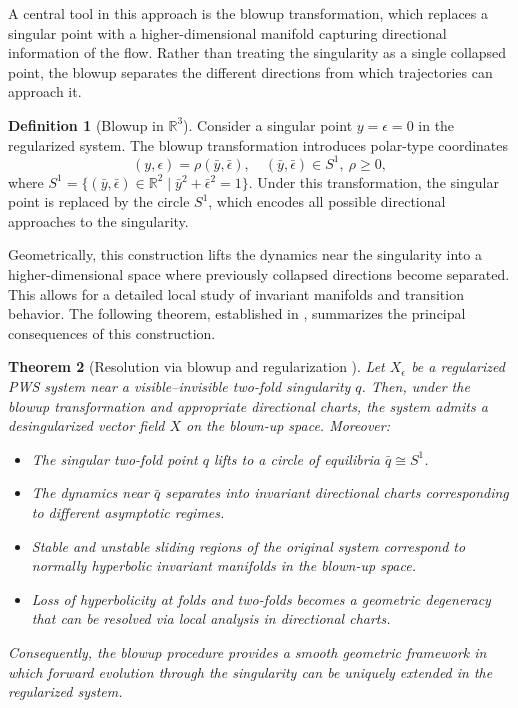 \documentclass[12pt, a4paper, oneside]{book}
\theoremstyle{plain}
\newtheorem{theorem}{Theorem}[chapter]
\theoremstyle{definition}
\newtheorem{definition}[theorem]{Definition}
\theoremstyle{remark}
\theoremstyle{definition}
\begin{document}
A central tool in this approach is the blowup transformation, which replaces a singular
point with a higher-dimensional manifold capturing directional information of the flow.
Rather than treating the singularity as a single collapsed point, the blowup separates
the different directions from which trajectories can approach it.

\begin{definition}[Blowup in $\mathbb{R}^3$]
Consider a singular point $y=\epsilon=0$ in the regularized system. The blowup
transformation introduces polar-type coordinates
\[
(y,\epsilon) = \rho(\bar{y}, \bar{\epsilon}), \quad (\bar{y},\bar{\epsilon}) \in S^1,
\ \rho \geq 0,
\]
where $S^1 = \{(\bar{y},\bar{\epsilon}) \in \mathbb{R}^2 \mid \bar{y}^2 +
\bar{\epsilon}^2 = 1\}$. Under this transformation, the singular point is replaced by
the circle $S^1$, which encodes all possible directional approaches to the singularity.
\end{definition}

Geometrically, this construction lifts the dynamics near the singularity into a
higher-dimensional space where previously collapsed directions become separated. This
allows for a detailed local study of invariant manifolds and transition behavior. The
following theorem, established in \cite{kristiansen2019resolution}, summarizes the
principal consequences of this construction.

\begin{theorem}[Resolution via blowup and regularization \cite{kristiansen2019resolution}]
Let $X_\epsilon$ be a regularized PWS system near a visible--invisible two-fold
singularity $q$. Then, under the blowup transformation and appropriate directional
charts, the system admits a desingularized vector field $X$ on the blown-up space.
Moreover:

\begin{itemize}
    \item The singular two-fold point $q$ lifts to a circle of equilibria
          $\bar{q} \cong S^1$.
    \item The dynamics near $\bar{q}$ separates into invariant directional charts
          corresponding to different asymptotic regimes.
    \item Stable and unstable sliding regions of the original system correspond to
          normally hyperbolic invariant manifolds in the blown-up space.
    \item Loss of hyperbolicity at folds and two-folds becomes a geometric degeneracy
          that can be resolved via local analysis in directional charts.
\end{itemize}

Consequently, the blowup procedure provides a smooth geometric framework in which forward
evolution through the singularity can be uniquely extended in the regularized system.
\end{theorem}
\end{document}
